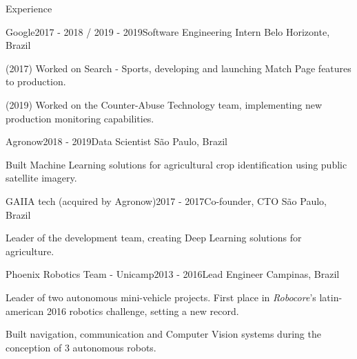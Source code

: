 \documentclass[8pt]{resume}
\newcommand{\tit}[1]{\textit{#1}}
\begin{document}
\begin{rSection}{Experience}

\begin{rSubsection}{Google}{2017 - 2018 / 2019 - 2019}{Software Engineering Intern}
    {Belo Horizonte, Brazil}
    \item (2017) Worked on Search - Sports, developing and launching Match Page features to production.
    \item (2019) Worked on the Counter-Abuse Technology team, implementing new production monitoring capabilities.
\end{rSubsection}

\begin{rSubsection}{Agronow}{2018 - 2019}{Data Scientist}
    {São Paulo, Brazil}
\item Built Machine Learning solutions for agricultural crop identification
        using public satellite imagery.
\end{rSubsection}

\begin{rSubsection}{GAIIA tech (acquired by Agronow)}{2017 - 2017}{Co-founder, CTO}
    {São Paulo, Brazil}
    \item Leader of the development team, creating Deep Learning solutions for agriculture.
\end{rSubsection}

\begin{rSubsection}{Phoenix Robotics Team - Unicamp}{2013 - 2016}{Lead Engineer}
    {Campinas, Brazil}
\item Leader of two autonomous mini-vehicle projects.
        First place in \tit{Robocore}'s latin-american 2016 robotics
        challenge, setting a new record.
    \item Built navigation, communication and Computer Vision systems
        during the conception of 3 autonomous robots.
\end{rSubsection}


\end{rSection}
\end{document}
